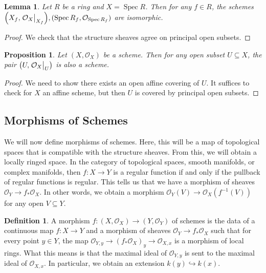 \documentclass[leqno, openany]{memoir}
\newtheorem{prop}[thm]{Proposition}
\newtheorem{lem}[thm]{Lemma}
\theoremstyle{definition}
\newtheorem{defn}[thm]{Definition}
\theoremstyle{remark}
\theoremstyle{plain}
\theoremstyle{definition}
\theoremstyle{remark}
\newcommand{\mc}[1]{\mathcal{#1}}
\DeclareMathOperator{\Spec}{Spec}
\begin{document}
\begin{lem} Let $R$ be a ring and $X = \Spec R$. Then for any $f \in R$, the
schemes $\qty(X_f, \eval{\mc{O}_X}_{X_f}), (\Spec R_f, \mc{O}_{\Spec R_f})$ are
isomorphic.  \end{lem}

\begin{proof} We check that the structure sheaves agree on principal open
subsets.  \end{proof}

\begin{prop} Let $(X, \mc{O}_X)$ be a scheme. Then for any open subset $U
\subseteq X$, the pair $\qty(U, \eval{\mc{O}_X}_{U})$ is also a scheme.
\end{prop}

\begin{proof} We need to show there exists an open affine covering of $U$. It
suffices to check for $X$ an affine scheme, but then $U$ is covered by
principal open subsets.  \end{proof}

\subsection{Morphisms of Schemes}%

We will now define morphisms of schemes. Here, this will be a map of
topological spaces that is compatible with the structure sheaves. From this, we
will obtain a locally ringed space. In the category of topological spaces,
smooth manifolds, or complex manifolds, then $f \colon X \to Y$ is a regular
function if and only if the pullback of regular functions is regular. This
tells us that we have a morphism of sheaves $\mc{O}_Y \to f_* \mc{O}_X$. In
other words, we obtain a morphism $\mc{O}_Y(V) \to \mc{O}_X(f^{-1}(V))$ for any
open $V \subseteq Y$.

\begin{defn} A morphism $f \colon (X, \mc{O}_X) \to (Y, \mc{O}_Y)$ of schemes
    is the data of a continuous map $f \colon X \to Y$ and a morphism of
    sheaves $\mc{O}_Y \to f_* \mc{O}_X$ such that for every point $y \in Y$,
    the map $\mc{O}_{Y,y} \to {(f_* \mc{O}_X)}_y \to \mc{O}_{X,x}$ is a
    morphism of local rings. What this means is that the maximal ideal of
    $\mc{O}_{Y,y}$ is sent to the maximal ideal of $\mc{O}_{X,x}$. In
    particular, we obtain an extension $k(y) \hookrightarrow k(x)$.  \end{defn}
\end{document}
